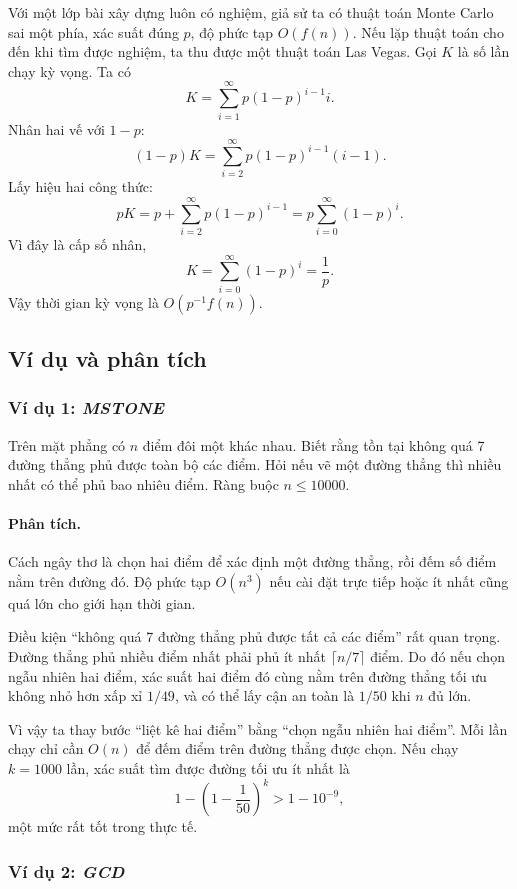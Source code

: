 \documentclass[11pt]{article}
\begin{document}
Với một lớp bài xây dựng luôn có nghiệm, giả sử ta có thuật toán Monte Carlo sai
một phía, xác suất đúng \(p\), độ phức tạp \(O(f(n))\). Nếu lặp thuật toán cho
đến khi tìm được nghiệm, ta thu được một thuật toán Las Vegas. Gọi \(K\) là số
lần chạy kỳ vọng. Ta có
\[
  K=\sum_{i=1}^{\infty} p(1-p)^{i-1}i.
\]
Nhân hai vế với \(1-p\):
\[
  (1-p)K=\sum_{i=2}^{\infty}p(1-p)^{i-1}(i-1).
\]
Lấy hiệu hai công thức:
\[
  pK=p+\sum_{i=2}^{\infty}p(1-p)^{i-1}
     =p\sum_{i=0}^{\infty}(1-p)^i.
\]
Vì đây là cấp số nhân,
\[
  K=\sum_{i=0}^{\infty}(1-p)^i=\frac{1}{p}.
\]
Vậy thời gian kỳ vọng là \(O(p^{-1}f(n))\).

\subsection{Ví dụ và phân tích}

\subsubsection{Ví dụ 1: \emph{MSTONE}}

Trên mặt phẳng có \(n\) điểm đôi một khác nhau. Biết rằng tồn tại không quá
7 đường thẳng phủ được toàn bộ các điểm. Hỏi nếu vẽ một đường thẳng thì nhiều
nhất có thể phủ bao nhiêu điểm. Ràng buộc \(n\le 10000\).

\paragraph{Phân tích.}
Cách ngây thơ là chọn hai điểm để xác định một đường thẳng, rồi đếm số điểm nằm
trên đường đó. Độ phức tạp \(O(n^3)\) nếu cài đặt trực tiếp hoặc ít nhất cũng
quá lớn cho giới hạn thời gian.

Điều kiện ``không quá 7 đường thẳng phủ được tất cả các điểm'' rất quan trọng.
Đường thẳng phủ nhiều điểm nhất phải phủ ít nhất \(\lceil n/7\rceil\) điểm.
Do đó nếu chọn ngẫu nhiên hai điểm, xác suất hai điểm đó cùng nằm trên đường
thẳng tối ưu không nhỏ hơn xấp xỉ \(1/49\), và có thể lấy cận an toàn là
\(1/50\) khi \(n\) đủ lớn.

Vì vậy ta thay bước ``liệt kê hai điểm'' bằng ``chọn ngẫu nhiên hai điểm''. Mỗi
lần chạy chỉ cần \(O(n)\) để đếm điểm trên đường thẳng được chọn. Nếu chạy
\(k=1000\) lần, xác suất tìm được đường tối ưu ít nhất là
\[
  1-\left(1-\frac1{50}\right)^k > 1-10^{-9},
\]
một mức rất tốt trong thực tế.

\subsubsection{Ví dụ 2: \emph{GCD}}
\end{document}
